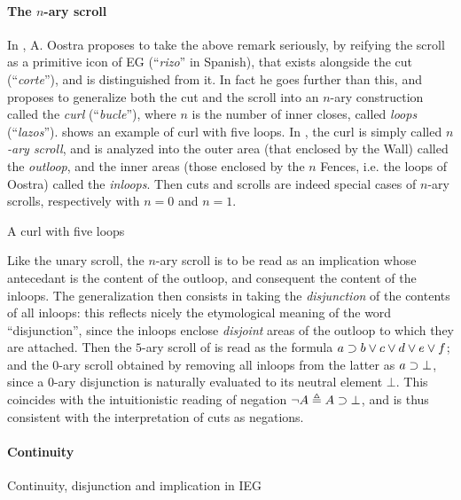 \paragraph{The $n$-ary scroll}

In \cite{oostra_graficos_2010}, A. Oostra proposes to take the above remark
seriously, by reifying the scroll as a primitive icon of EG (``\emph{rizo}'' in
Spanish), that exists alongside the cut (``\emph{corte}''), and is distinguished
from it. In fact he goes further than this, and proposes to generalize both the
cut and the scroll into an $n$-ary construction called the \emph{curl}
(``\emph{bucle}''), where $n$ is the number of inner closes, called \emph{loops}
(``\emph{lazos}'').  shows an example of curl with five
loops. In \cite{minghui_graphical_2019}, the curl is simply called \emph{$n$-ary
scroll}, and is analyzed into the outer area (that enclosed by the Wall) called
the \emph{outloop}, and the inner areas (those enclosed by the $n$ Fences, i.e.
the loops of Oostra) called the \emph{inloops}. Then cuts and scrolls are indeed
special cases of $n$-ary scrolls, respectively with $n = 0$ and $n = 1$.

\begin{marginfigure}
  \caption{A curl with five loops}
\end{marginfigure}

Like the unary scroll, the $n$-ary scroll is to be read as an implication whose
antecedant is the content of the outloop, and consequent the content of the
inloops. The generalization then consists in taking the \emph{disjunction} of
the contents of all inloops: this reflects nicely the etymological meaning of
the word ``disjunction'', since the inloops enclose \emph{disjoint} areas of the
outloop to which they are attached. Then the $5$-ary scroll of
 is read as the formula $a \supset b \lor c \lor d \lor e \lor
f$; and the $0$-ary scroll obtained by removing all inloops from the latter as
$a \supset \bot$, since a $0$-ary disjunction is naturally evaluated to its
neutral element $\bot$. This coincides with the intuitionistic reading of
negation $\neg A \triangleq A \supset \bot$, and is thus consistent with the
interpretation of cuts as negations.

\paragraph{Continuity}

\begin{marginfigure}
  
  \caption{Continuity, disjunction and implication in IEG}
\end{marginfigure}

